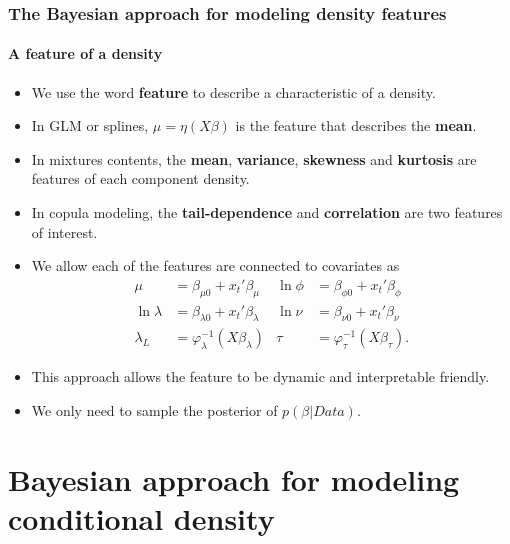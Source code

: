 \documentclass[11pt]{beamer}
\begin{document}
\begin{frame}
  \frametitle{The Bayesian approach for modeling density features}
  \framesubtitle{A feature of a density}

  \begin{itemize}
  \item We use the word \textbf{feature} to describe a characteristic of a
    density.

  \item In GLM or splines, $\mu = \eta (X\beta)$ is the feature that describes the \textbf{mean}.

  \item In mixtures contents, the \textbf{mean}, \textbf{variance},
    \textbf{skewness} and \textbf{kurtosis} are features of each component
    density.

  \item In copula modeling, the \textbf{tail-dependence} and
    \textbf{correlation} are two features of interest.

  \item We allow each of the features are connected to covariates as
    \begin{align*}
        \mu & =  \beta_{\mu0}+x_{t}'\beta_{\mu} &
        \ln\phi & =  \beta_{\phi0}+x_{t}'\beta_{\phi} \\
        \ln\lambda & =  \beta_{\lambda0}+x_{t}'\beta_{\lambda} &
        \ln\nu & = \beta_{\nu0}+x_{t}'\beta_{\nu}\\
        \lambda_L & = \varphi_{\lambda}^{-1}(X\beta_\lambda) &
        \tau &= \varphi_{\tau}^{-1}(X\beta_\tau).
    \end{align*}

  \item This approach allows the feature to be dynamic and interpretable
    friendly.

  \item We only need to sample the posterior of $p(\beta|Data)$.

  \end{itemize}

\end{frame}

\section{Bayesian approach for modeling conditional density}
\end{document}
